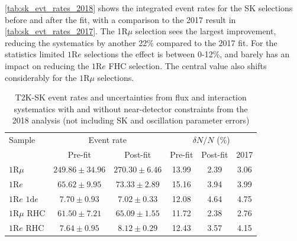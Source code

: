 \autoref{tab:sk_evt_rates_2018} shows the integrated event rates for the SK selections before and after the fit, with a comparison to the 2017 result in \autoref{tab:sk_evt_rates_2017}. The 1$\text{R}\mu$ selection sees the largest improvement, reducing the systematics by another 22\% compared to the 2017 fit. For the statistics limited $1\text{R}e$ selections the effect is between 0-12\%, and barely has an impact on reducing the $1\text{R}e$ FHC selection. The central value also shifts considerably for the $1\text{R}\mu$ selections.
\begin{table}
	\begin{tabular}{l | c c | c c | c}
		\hline
		\hline
		Sample & \multicolumn{2}{c|}{Event rate} & \multicolumn{3}{c}{$\delta N/N$ (\%)} \\
		& Pre-fit & Post-fit & Pre-fit & Post-fit & 2017 \\
		\hline
		$1\text{R}\mu$ & $249.86\pm34.96$ & $270.30\pm6.46$ & 13.99 & 2.39 & 3.06\\
		$1\text{R}e$ & $65.62\pm9.95$ & $73.33\pm2.89$ & 15.16 &  3.94 &  3.99  \\
		$1\text{R}e \text{ 1d}e$ & $7.70\pm0.93$ & $7.02\pm0.33$ & 12.08 & 4.64 & 4.75 \\
		
		$1\text{R}\mu \text{ RHC}$ & $61.50\pm7.21$ & $65.09\pm1.55$ & 11.72 & 2.38 & 2.76 \\
		$1\text{R}e \text{ RHC}$ & $7.64\pm0.95$ & $8.12\pm0.29$ & 12.43 & 3.57 & 4.15 \\
		\hline
		\hline
	\end{tabular}
	\caption{T2K-SK event rates and uncertainties from flux and interaction systematics with and without near-detector constraints from the 2018 analysis (not including SK and oscillation parameter errors)}
	\label{tab:sk_evt_rates_2018}
\end{table}

